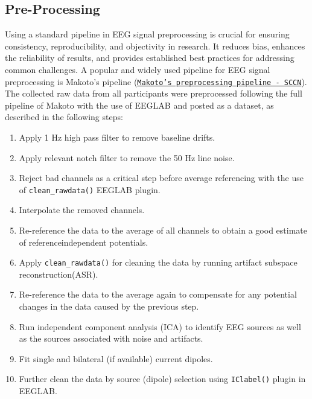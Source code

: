 \documentclass[12pt]{article}
\begin{document}
\subsection{Pre-Processing}
Using a standard pipeline in EEG signal preprocessing is crucial for ensuring consistency, reproducibility, and objectivity in research. It reduces bias, enhances the reliability of results, and provides established best practices for addressing common challenges. A popular and widely used pipeline for EEG signal preprocessing is Makoto's pipeline (\href{https://sccn.ucsd.edu/wiki/Makoto's_preprocessing_pipeline}{\texttt{Makoto’s preprocessing pipeline - SCCN}}).\\

The collected raw data from all participants were preprocessed following the full pipeline of Makoto with the use of EEGLAB and posted as a dataset, as described in the following steps:

\begin{enumerate}
	\item  Apply 1 Hz high pass filter to remove baseline drifts.
	\item  Apply relevant notch filter to remove the 50 Hz line noise.
	\item  Reject bad channels as a critical step before average referencing with the use of \texttt{clean\_rawdata()} EEGLAB plugin.
	\item  Interpolate the removed channels.
	\item  Re-reference the data to the average of all channels to obtain a good estimate of referenceindependent potentials.
	\item  Apply \texttt{clean\_rawdata()} for cleaning the data by running artifact subspace reconstruction(ASR).
	\item  Re-reference the data to the average again to compensate for any potential changes in the data caused by the previous step.
	\item  Run independent component analysis (ICA) to identify EEG sources as well as the sources associated with noise and artifacts.
	\item  Fit single and bilateral (if available) current dipoles.
	\item  Further clean the data by source (dipole) selection using \texttt {IClabel()} plugin in EEGLAB.
\end{enumerate}
\end{document}
